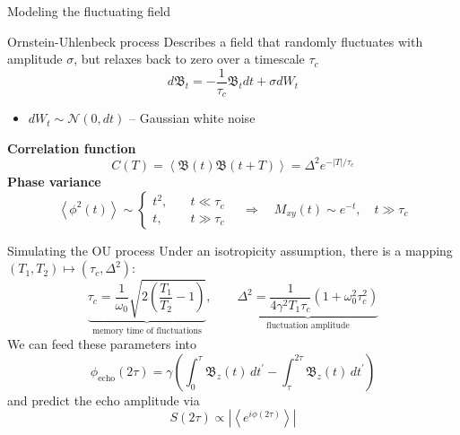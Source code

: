 \documentclass[aspectratio=169,xcolor=dvipsnames]{beamer}
\begin{document}
\begin{frame}{Modeling the fluctuating field}
    \begin{block}{Ornstein-Uhlenbeck process}
        Describes a field that randomly fluctuates with amplitude $\sigma$, but relaxes back to zero over a timescale $\tau_c$
        \begin{equation*}
            d\mathfrak{B}_t = -\frac{1}{\tau_c}\mathfrak{B}_tdt + \sigma dW_t 
        \end{equation*}
        \begin{itemize}
            \item[$\bullet$] $dW_t \sim \mathcal{N}(0,dt)$ -- Gaussian white noise
        \end{itemize}
    \end{block}
    \textbf{Correlation function}
    \begin{equation*}
       C(T)=\left\langle \mathfrak{B}(t) \mathfrak{B}(t+T)\right\rangle = \Delta^2 e^{-\left\lvert T \right\rvert /\tau_c}
    \end{equation*}
    \textbf{Phase variance}
    \begin{equation*}
        \left\langle \phi^2(t)\right\rangle \sim 
        \begin{cases}
            t^2,&\quad t\ll \tau_c\\
            t,&\quad t\gg\tau_c
        \end{cases}
        \quad\Longrightarrow\quad \boxed{M_{xy} (t) \sim e^{-t},\quad t\gg\tau_c}
    \end{equation*}
\end{frame}


\begin{frame}{Simulating the OU process}
    Under an isotropicity assumption, there is a mapping $\left(T_1,T_2\right) \mapsto \left(\tau_c, \Delta^2\right)$:
    \begin{equation*}
        \underbrace{\tau_c = \frac{1}{\omega_0}\sqrt{2\left(\frac{T_1}{T_2}-1\right)}}_{\text{memory time of fluctuations}},\qquad \underbrace{\Delta^2 = \frac{1}{4\gamma^2 T_1 \tau_c}\left( 1+\omega_0^2\tau_c^2\right)}_{\text{fluctuation amplitude}}
    \end{equation*}
    We can feed these parameters into
    \begin{equation*}
        \phi_{\text{echo}}(2\tau) = \gamma\left(\int_0^{\tau}\mathfrak{B}_z(t)\,dt^\prime - \int_\tau^{2\tau}\mathfrak{B}_z(t)\,dt^\prime\right)
    \end{equation*}
    and predict the echo amplitude via
    \begin{equation*}
        S(2\tau) \propto \left\lvert\left\langle e^{i\phi(2\tau)}\right\rangle\right\rvert
    \end{equation*}
\end{frame}
\end{document}
